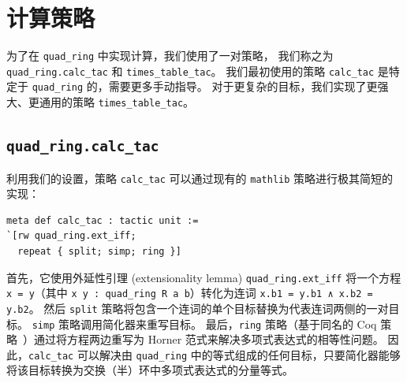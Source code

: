 \documentclass[sigplan,10pt,nonacm,
screen]{acmart} \settopmatter{printfolios=true,printccs=false,printacmref=false}
\newcommand{\mathlib}{\lstinline{mathlib}\xspace}
\begin{document}

\section{计算策略}\label{sec:computational-tactics}

为了在 \lstinline{quad_ring} 中实现计算，我们使用了一对策略，
我们称之为 \lstinline{quad_ring.calc_tac} 和 \lstinline{times_table_tac}。
我们最初使用的策略 \lstinline{calc_tac} 是特定于 \lstinline{quad_ring} 的，需要更多手动指导。
对于更复杂的目标，我们实现了更强大、更通用的策略 \lstinline{times_table_tac}。

\subsection{\lstinline{quad_ring.calc_tac}}

利用我们的设置，策略 \lstinline{calc_tac} 可以通过现有的 \mathlib 策略进行极其简短的实现：
\begin{lstlisting}
meta def calc_tac : tactic unit :=
`[rw quad_ring.ext_iff;
  repeat { split; simp; ring }]
\end{lstlisting}
首先，它使用外延性引理 (extensionality lemma) \lstinline{quad_ring.ext_iff} 将一个方程 \lstinline{x = y}（其中 \lstinline{x y : quad_ring R a b}）转化为连词 \lstinline{x.b1 = y.b1 ∧ x.b2 = y.b2}。
然后 \lstinline{split} 策略将包含一个连词的单个目标替换为代表连词两侧的一对目标。
\lstinline{simp} 策略调用简化器来重写目标。
最后，\lstinline{ring} 策略（基于同名的 Coq 策略~\cite{ring-tactic}）通过将方程两边重写为 Horner 范式来解决多项式表达式的相等性问题。
因此，\lstinline{calc_tac} 可以解决由 \lstinline{quad_ring} 中的等式组成的任何目标，只要简化器能够将该目标转换为交换（半）环中多项式表达式的分量等式。
\end{document}

